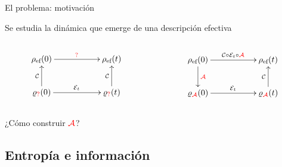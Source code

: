 \begin{frame}{El problema: motivación}
    \begin{center}
        Se estudia la dinámica que emerge de una descripción efectiva
    \end{center}
    \begin{columns}
        \begin{column}{0.5\textwidth}
            \begin{displaymath}
                \xymatrix{
                  {\rho_{\ef}(0)} \ar[rr]^{\text{\textcolor{red}{?}}}
                  && {\rho_{\ef}(t)}\\
                  {\varrho_{\text{\textcolor{red}{?}}}(0)} \ar[rr]^{\mcE_{t}} \ar[u]^{\mcC}
                  && {\varrho_{\text{\textcolor{red}{?}}}(t)} \ar[u]^{\mcC}
                }
              \end{displaymath}
        \end{column}
        \pause
        \begin{column}{0.5\textwidth}
            \begin{displaymath}
                \xymatrix{
                  {\rho_{\ef}(0)} \ar[rr]^{{\mcC\circ\mcE_{t}\circ\color{red}\mcA}} \ar[d]^{{\color{red}\mcA}}
                  && {\rho_{\ef}(t)}\\
                  {\varrho_{{\color{red}\mcA}}(0)} \ar[rr]^{\mcE_{t}}
                  && {\varrho_{{\color{red}\mcA}}(t)} \ar[u]^{\mcC}
                }
              \end{displaymath}
              \pause
        \end{column}
    \end{columns}
    \begin{center}
        ¿Cómo construir ${\color{red}\mathcal{A}}$?
    \end{center}
\end{frame}

\subsection{Entropía e información}

